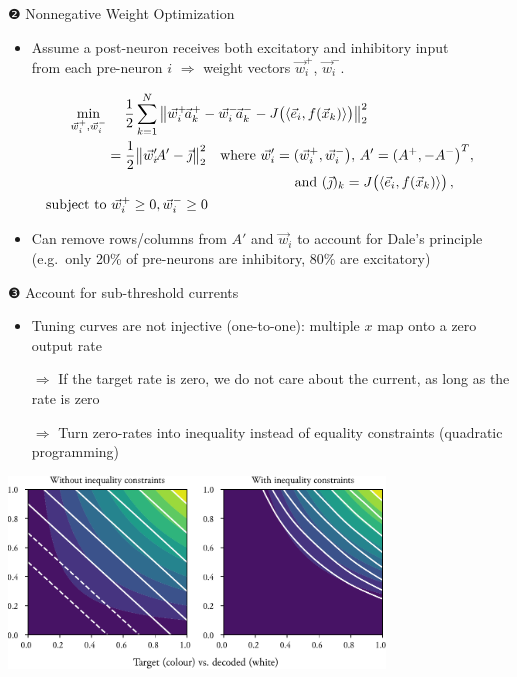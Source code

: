 \documentclass[aspectratio=169]{beamer}
\renewcommand{\emph}[1]{{\color{violet}\textit{#1}}}
\begin{document}
\begin{frame}{❷ Nonnegative Weight Optimization}
	\begin{itemize}
		\item Assume a post-neuron receives both excitatory and inhibitory input\\
		     from each pre-neuron $i$ \emph{$\Rightarrow$} weight vectors $\vec w_i^+$, $\vec w_i^-$.
	\end{itemize}

	\begin{align*}
	\begin{aligned}
	\min_{\vec w_i^+, \vec w_i^-} &~\hphantom{=\,} \frac{1}2 \sum_{k=1}^N \big\| \vec w_i^+\!\vec a_k^+ - \vec w_i^-\!\vec a_k^- - J\big(\langle \vec e_i, f(\vec x_k)\rangle\big) \big\|_2^2 \\
	&= \frac{1}2 \big\| \vec w_i'\!A' - \vec \jmath \big\|_2^2 \quad\text{where } \vec w_i' = (\vec w_i^+, \vec w_i^-\big),\, A' =  (A^+, -A^-\big)^T,\\&~ \hspace{4.625cm} \text{and } (\vec \jmath)_k = J\big(\langle \vec e_i, f(\vec x_k)\rangle\big) \,, \\
	\text{subject to} &~ \vec w_i^+ \geq 0, \vec w_i^- \geq 0
	\end{aligned}
	\end{align*}
	\vspace{0.25cm}
	\begin{itemize}
		\item Can remove rows/columns from $A'$ and $\vec w_i$ to account for Dale's principle (e.g.~only 20\% of pre-neurons are inhibitory, 80\% are excitatory)
	\end{itemize}
\end{frame}

\begin{frame}{❸ Account for sub-threshold currents}
	\begin{itemize}
		\item Tuning curves are not injective (one-to-one): multiple $x$ map onto a zero output rate
		\item[$\Rightarrow$] If the target rate is zero, we do not care about the current, as long as the rate is zero
		\item[$\Rightarrow$] Turn zero-rates into inequality instead of equality constraints (quadratic programming)
	\end{itemize}
	\centering
	\includegraphics[width=0.75\textwidth]{media/mask_negative.pdf}
\end{frame}
\end{document}
